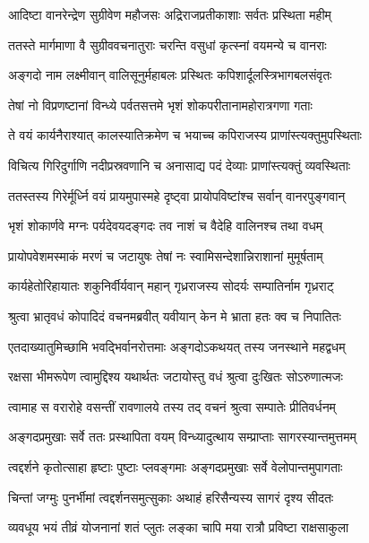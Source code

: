 \twolineshloka
{आदिष्टा वानरेन्द्रेण सुग्रीवेण महौजसः}
{अद्रिराजप्रतीकाशाः सर्वतः प्रस्थिता महीम्} %

\twolineshloka
{ततस्ते मार्गमाणा वै सुग्रीववचनातुराः}
{चरन्ति वसुधां कृत्स्नां वयमन्ये च वानराः} %

\twolineshloka
{अङ्गदो नाम लक्ष्मीवान् वालिसूनुर्महाबलः}
{प्रस्थितः कपिशार्दूलस्त्रिभागबलसंवृतः} %

\twolineshloka
{तेषां नो विप्रणष्टानां विन्ध्ये पर्वतसत्तमे}
{भृशं शोकपरीतानामहोरात्रगणा गताः} %

\twolineshloka
{ते वयं कार्यनैराश्यात् कालस्यातिक्रमेण च}
{भयाच्च कपिराजस्य प्राणांस्त्यक्तुमुपस्थिताः} %

\twolineshloka
{विचित्य गिरिदुर्गाणि नदीप्रस्रवणानि च}
{अनासाद्य पदं देव्याः प्राणांस्त्यक्तुं व्यवस्थिताः} %

\twolineshloka
{ततस्तस्य गिरेर्मूर्ध्नि वयं प्रायमुपास्महे}
{दृष्ट्वा प्रायोपविष्टांश्च सर्वान् वानरपुङ्गवान्} %

\twolineshloka
{भृशं शोकार्णवे मग्नः पर्यदेवयदङ्गदः}
{तव नाशं च वैदेहि वालिनश्च तथा वधम्} %

\twolineshloka
{प्रायोपवेशमस्माकं मरणं च जटायुषः}
{तेषां नः स्वामिसन्देशान्निराशानां मुमूर्षताम्} %

\twolineshloka
{कार्यहेतोरिहायातः शकुनिर्वीर्यवान् महान्}
{गृध्रराजस्य सोदर्यः सम्पातिर्नाम गृध्रराट्} %

\twolineshloka
{श्रुत्वा भ्रातृवधं कोपादिदं वचनमब्रवीत्}
{यवीयान् केन मे भ्राता हतः क्व च निपातितः} %

\twolineshloka
{एतदाख्यातुमिच्छामि भवद्भिर्वानरोत्तमाः}
{अङ्गदोऽकथयत् तस्य जनस्थाने महद्वधम्} %

\twolineshloka
{रक्षसा भीमरूपेण त्वामुद्दिश्य यथार्थतः}
{जटायोस्तु वधं श्रुत्वा दुःखितः सोऽरुणात्मजः} %

\twolineshloka
{त्वामाह स वरारोहे वसन्तीं रावणालये}
{तस्य तद् वचनं श्रुत्वा सम्पातेः प्रीतिवर्धनम्} %

\twolineshloka
{अङ्गदप्रमुखाः सर्वे ततः प्रस्थापिता वयम्}
{विन्ध्यादुत्थाय सम्प्राप्ताः सागरस्यान्तमुत्तमम्} %

\twolineshloka
{त्वद्दर्शने कृतोत्साहा हृष्टाः पुष्टाः प्लवङ्गमाः}
{अङ्गदप्रमुखाः सर्वे वेलोपान्तमुपागताः} %

\twolineshloka
{चिन्तां जग्मुः पुनर्भीमां त्वद्दर्शनसमुत्सुकाः}
{अथाहं हरिसैन्यस्य सागरं दृश्य सीदतः} %

\twolineshloka
{व्यवधूय भयं तीव्रं योजनानां शतं प्लुतः}
{लङ्का चापि मया रात्रौ प्रविष्टा राक्षसाकुला} %

